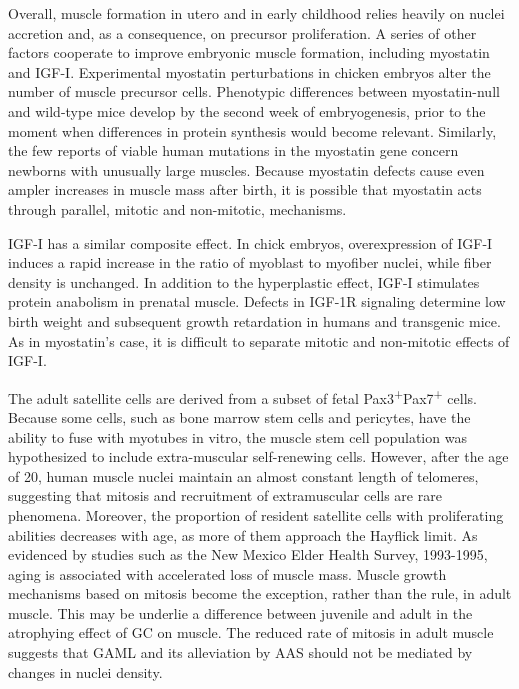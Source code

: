 \documentclass[12pt,english]{report}\usepackage[]{graphicx}\usepackage[]{color}
\begin{document}
Overall, muscle formation in utero and in early childhood relies heavily
on nuclei accretion and, as a consequence, on precursor proliferation.
A series of other factors cooperate to improve embryonic muscle formation,
including myostatin and IGF-I. Experimental myostatin perturbations
in chicken embryos alter the number of muscle precursor cells\citep{manceau2008myostatin}.
Phenotypic differences between myostatin-null and wild-type mice develop
by the second week of embryogenesis, prior to the moment when differences
in protein synthesis would become relevant\citep{matsakas2010altered}.
Similarly, the few reports of viable human mutations in the myostatin
gene concern newborns with unusually large muscles\citep{schuelke2004myostatin}.
Because myostatin defects cause even ampler increases in muscle mass
after birth\citep{lin2002myostatin,schuelke2004myostatin}, it is
possible that myostatin acts through parallel, mitotic and non-mitotic,
mechanisms.

IGF-I has a similar composite effect. In chick embryos, overexpression
of IGF-I induces a rapid increase in the ratio of myoblast to myofiber
nuclei, while fiber density is unchanged\citep{mitchell2002insulin-like}.
In addition to the hyperplastic effect, IGF-I stimulates protein anabolism
in prenatal muscle\citep{shen2003protein}. Defects in IGF-1R signaling
determine low birth weight and subsequent growth retardation in humans
and transgenic mice\citep{fernandez2001functional,abuzzahab2003igf-i}.
As in myostatin's case, it is difficult to separate mitotic and non-mitotic
effects of IGF-I.

The adult satellite cells are derived from a subset of fetal Pax3\textsuperscript{+}Pax7\textsuperscript{+}
cells. Because some cells, such as bone marrow stem cells and pericytes,
have the ability to fuse with myotubes in vitro, the muscle stem cell
population was hypothesized to include extra-muscular self-renewing
cells\citep{dellavalle2011pericytes,labarge2002biological}. However,
after the age of 20, human muscle nuclei maintain an almost constant
length of telomeres, suggesting that mitosis and recruitment of extramuscular
cells are rare phenomena\citep{decary1997replicative}. Moreover,
the proportion of resident satellite cells with proliferating abilities
decreases with age, as more of them approach the Hayflick limit\citep{renault2000skeletal}.
As evidenced by studies such as the New Mexico Elder Health Survey,
1993-1995, aging is associated with accelerated loss of muscle mass\citep{baumgartner1998epidemiology}.
Muscle growth mechanisms based on mitosis become the exception, rather
than the rule, in adult muscle. This may be underlie a difference
between juvenile and adult in the atrophying effect of GC on muscle.
The reduced rate of mitosis in adult muscle suggests that GAML and
its alleviation by AAS should not be mediated by changes in nuclei
density.
\end{document}
